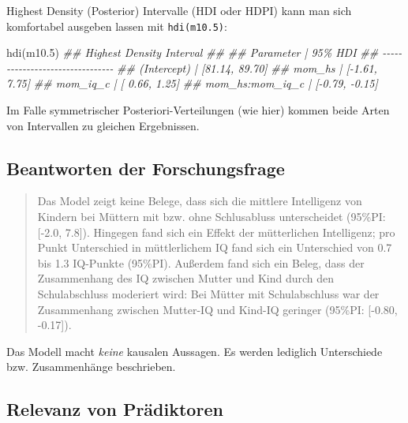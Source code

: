 \documentclass[
  a4paper,
  DIV=11]{scrreprt}
\newenvironment{Shaded}{\begin{snugshade}}{\end{snugshade}}
\newcommand{\DocumentationTok}[1]{\textcolor[rgb]{0.37,0.37,0.37}{\textit{#1}}}
\newcommand{\FloatTok}[1]{\textcolor[rgb]{0.68,0.00,0.00}{#1}}
\newcommand{\FunctionTok}[1]{\textcolor[rgb]{0.28,0.35,0.67}{#1}}
\newcommand{\NormalTok}[1]{\textcolor[rgb]{0.00,0.23,0.31}{#1}}
\theoremstyle{definition}
\theoremstyle{remark}
\begin{document}
Highest Density (Posterior) Intervalle (HDI oder HDPI) kann man sich
komfortabel ausgeben lassen mit \texttt{hdi(m10.5)}:

\begin{Shaded}
\begin{Highlighting}[]
\FunctionTok{hdi}\NormalTok{(m10}\FloatTok{.5}\NormalTok{)}
\DocumentationTok{\#\# Highest Density Interval}
\DocumentationTok{\#\# }
\DocumentationTok{\#\# Parameter       |        95\% HDI}
\DocumentationTok{\#\# {-}{-}{-}{-}{-}{-}{-}{-}{-}{-}{-}{-}{-}{-}{-}{-}{-}{-}{-}{-}{-}{-}{-}{-}{-}{-}{-}{-}{-}{-}{-}{-}}
\DocumentationTok{\#\# (Intercept)     | [81.14, 89.70]}
\DocumentationTok{\#\# mom\_hs          | [{-}1.61,  7.75]}
\DocumentationTok{\#\# mom\_iq\_c        | [ 0.66,  1.25]}
\DocumentationTok{\#\# mom\_hs:mom\_iq\_c | [{-}0.79, {-}0.15]}
\end{Highlighting}
\end{Shaded}

Im Falle symmetrischer Posteriori-Verteilungen (wie hier) kommen beide
Arten von Intervallen zu gleichen Ergebnissen.

\hypertarget{beantworten-der-forschungsfrage}{%
\subsection{Beantworten der
Forschungsfrage}\label{beantworten-der-forschungsfrage}}

\begin{quote}
Das Model zeigt keine Belege, dass sich die mittlere Intelligenz von
Kindern bei Müttern mit bzw. ohne Schlusabluss unterscheidet (95\%PI:
{[}-2.0, 7.8{]}). Hingegen fand sich ein Effekt der mütterlichen
Intelligenz; pro Punkt Unterschied in müttlerlichem IQ fand sich ein
Unterschied von 0.7 bis 1.3 IQ-Punkte (95\%PI). Außerdem fand sich ein
Beleg, dass der Zusammenhang des IQ zwischen Mutter und Kind durch den
Schulabschluss moderiert wird: Bei Mütter mit Schulabschluss war der
Zusammenhang zwischen Mutter-IQ und Kind-IQ geringer (95\%PI: {[}-0.80,
-0.17{]}).
\end{quote}

Das Modell macht \emph{keine} kausalen Aussagen. Es werden lediglich
Unterschiede bzw. Zusammenhänge beschrieben.

\hypertarget{relevanz-von-pruxe4diktoren}{%
\subsection{Relevanz von
Prädiktoren}\label{relevanz-von-pruxe4diktoren}}
\end{document}
